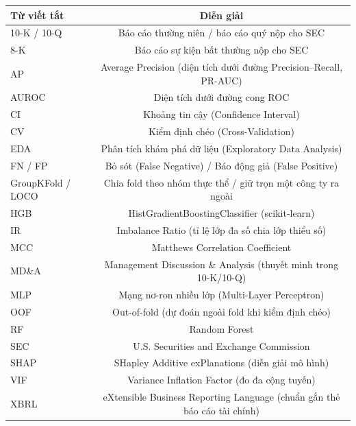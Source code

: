 \documentclass[13pt,a4paper]{extreport}
\begin{document}
\begin{table}[H]
\centering
\begin{center}
\small
\begin{tabular}{|l|c|}
\hline
\textbf{Từ viết tắt} & \textbf{Diễn giải} \\ \hline
10-K / 10-Q & Báo cáo thường niên / báo cáo quý nộp cho SEC \\ \hline
8-K & Báo cáo sự kiện bất thường nộp cho SEC \\ \hline
AP & Average Precision (diện tích dưới đường Precision–Recall, PR-AUC) \\ \hline
AUROC & Diện tích dưới đường cong ROC \\ \hline
CI & Khoảng tin cậy (Confidence Interval) \\ \hline
CV & Kiểm định chéo (Cross-Validation) \\ \hline
EDA & Phân tích khám phá dữ liệu (Exploratory Data Analysis) \\ \hline
FN / FP & Bỏ sót (False Negative) / Báo động giả (False Positive) \\ \hline
GroupKFold / LOCO & Chia fold theo nhóm thực thể / giữ trọn một công ty ra ngoài \\ \hline
HGB & HistGradientBoostingClassifier (scikit-learn) \\ \hline
IR & Imbalance Ratio (tỉ lệ lớp đa số chia lớp thiểu số) \\ \hline
MCC & Matthews Correlation Coefficient \\ \hline
MD\&A & Management Discussion \& Analysis (thuyết minh trong 10-K/10-Q) \\ \hline
MLP & Mạng nơ-ron nhiều lớp (Multi-Layer Perceptron) \\ \hline
OOF & Out-of-fold (dự đoán ngoài fold khi kiểm định chéo) \\ \hline
RF & Random Forest \\ \hline
SEC & U.S. Securities and Exchange Commission \\ \hline
SHAP & SHapley Additive exPlanations (diễn giải mô hình) \\ \hline
VIF & Variance Inflation Factor (đo đa cộng tuyến) \\ \hline
XBRL & eXtensible Business Reporting Language (chuẩn gắn thẻ báo cáo tài chính) \\ \hline
\end{tabular}
\end{center}
\end{table}

\clearpage
\end{document}
